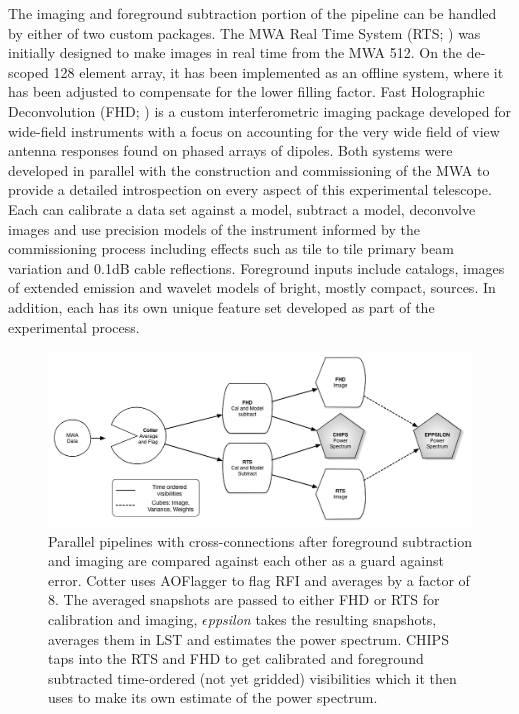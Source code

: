\documentclass[preprint]{aastex}
\def\eppsilon{{\it $\epsilon$ppsilon }}
\begin{document}
The imaging and foreground subtraction portion of the pipeline can be handled by either of two custom packages.  The MWA Real Time System (RTS; \cite{Ord:2010p8442}) was initially designed to make images in real time from the MWA 512.  On the de-scoped 128 element array, it has been implemented as an offline system, where it has been adjusted to compensate for the lower filling factor.  Fast Holographic Deconvolution (FHD; \cite{Sullivan:2012p9457}) is a custom interferometric imaging package developed for wide-field instruments with a focus on accounting for the very wide field of view antenna responses found on phased arrays of dipoles.  Both systems were developed in parallel with the construction and commissioning of the MWA to provide a detailed introspection on every aspect of this experimental telescope. Each can calibrate a data set against a model, subtract a model, deconvolve images and use precision models of the instrument informed by the commissioning process including effects such as tile to tile primary beam variation and 0.1dB cable reflections.  Foreground inputs include catalogs, images of extended emission and wavelet models of bright, mostly compact, sources.  In addition, each has its own unique feature set developed as part of the experimental process.

\begin{figure}[htbp]
\begin{center}
\includegraphics[width=\textwidth]{figures/MWA_Pipes.png}
\caption{Parallel pipelines with cross-connections after foreground subtraction and imaging are compared against each other as a guard against error.  Cotter uses AOFlagger to flag RFI and averages by a factor of 8. The averaged snapshots are passed to either FHD or RTS for calibration and imaging, \eppsilon takes the resulting snapshots, averages them in LST and estimates the power spectrum. CHIPS taps into the RTS and FHD to get calibrated and foreground subtracted time-ordered (not yet gridded) visibilities which it then uses to make its own estimate of the power spectrum. }
\label{fig:pipes}
\end{center}
\end{figure}
\end{document}
